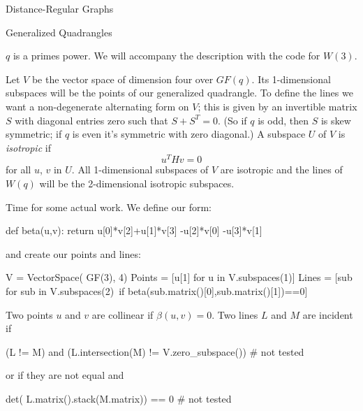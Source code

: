 \begin{chap}{Distance-Regular Graphs}
\begin{sect}{Generalized Quadrangles}
\begin{para}
$q$ is a primes power. We will accompany the description with the
code for $W(3)$.
\end{para}
%
\begin{para}
Let $V$ be the vector space of dimension four over $GF(q)$. Its 1-dimensional
subspaces will be the points of our generalized quadrangle. To define
the lines we want a non-degenerate alternating form on $V$; this is
given by an invertible matrix $S$ with diagonal entries zero such that $S+S^T=0$.
(So if $q$ is odd, then $S$ is skew symmetric; if $q$ is even it's symmetric
with zero diagonal.) A subspace $U$ of $V$ is \textsl{isotropic}
if
\[
    u^THv = 0
\]
for all $u$, $v$ in $U$. All 1-dimensional subspaces of $V$ are isotropic and the
lines of $W(q)$ will be the 2-dimensional isotropic subspaces.
\end{para}
%
\begin{para}
Time for some actual work. We define our form:
\end{para}
%
\begin{sagecode}
\begin{sageinput}
def beta(u,v):
    return u[0]*v[2]+u[1]*v[3] -u[2]*v[0] -u[3]*v[1]
\end{sageinput}
\end{sagecode}
%
\begin{para}
and create our points and lines:
\end{para}
%
\begin{sagecode}
\begin{sageinput}
V = VectorSpace( GF(3), 4)
Points = [u[1] for u in V.subspaces(1)]
Lines = [sub for sub in V.subspaces(2)\
    if beta(sub.matrix()[0],sub.matrix()[1])==0]
\end{sageinput}
\end{sagecode}
%
\begin{para}
Two points $u$ and $v$ are collinear if $\beta(u,v)=0$. Two lines $L$ and $M$ 
are incident if
\end{para}
%
\begin{sagecode}
\begin{sageinput}
(L != M) and (L.intersection(M) != V.zero_subspace()) # not tested
\end{sageinput}
\end{sagecode}
%
\begin{para}
or if they are not equal and
\end{para}
%
\begin{sagecode}
\begin{sageinput}
det( L.matrix().stack(M.matrix)) == 0 # not tested

\end{sageinput}
\end{sagecode}
\end{sect}
\end{chap}
